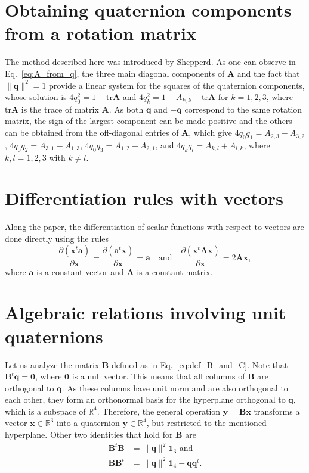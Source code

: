 \documentclass[aip,jcp,reprint,amsmath,amssymb,raggedbottom]{revtex4-1}
\newcommand{\mt}[1]{\boldsymbol{\mathbf{#1}}}           %
\newcommand{\vt}[1]{\boldsymbol{\mathbf{#1}}}           %
\newcommand{\tr}[1]{#1^t}                               %
\newcommand{\diff}[2]{\dfrac{\partial #1}{\partial #2}} %
\begin{document}
\section{Obtaining quaternion components from a rotation matrix}
\label{sec:quat_from_A}

The method described here was introduced by Shepperd.\cite{Shepperd1978} As one can observe in Eq.~\ref{eq:A_from_q}, the three main diagonal components of $\mt A$ and the fact that $\lVert \vt q \lVert^2 = 1$ provide a linear system for the squares of the quaternion components, whose solution is $4 q_0^2 = 1 + \text{tr}\mt A$ and $4 q_k^2 = 1 + A_{k,k} - \text{tr}\mt A$ for $k = 1, 2, 3$, where $\text{tr}\mt A$ is the trace of matrix $\mt A$. As both $\vt q$ and $- \vt q$ correspond to the same rotation matrix, the sign of the largest component\cite{Shepperd1978} can be made positive and the others can be obtained from the off-diagonal entries of $\mt A$, which give $4 q_0 q_1 = A_{2,3} - A_{3,2}$, $4 q_0 q_2 = A_{3,1} - A_{1,3}$, $4 q_0 q_3 = A_{1,2} - A_{2,1}$, and $4 q_k q_l = A_{k,l} + A_{l,k}$, where $k,l = 1,2,3$ with $k \neq l$.

\section{Differentiation rules with vectors}
\label{sec:Diff_Rules}

Along the paper, the differentiation of scalar functions with respect to vectors are done directly using the rules
\[
\diff{(\tr{\vt x}\vt a)}{\vt x} = \diff{(\tr{\vt a}\vt x)}{\vt x} = \vt a \quad \text{and} \quad \diff{(\tr{\vt x}\mt A \vt x)}{\vt x} = 2 \mt A \vt x,
\]
where $\vt a$ is a constant vector and $\mt A$ is a constant matrix.

\section{Algebraic relations involving unit quaternions}
\label{sec:auxiliary_math}

Let us analyze the matrix $\mt B$ defined as in Eq.~\ref{eq:def_B_and_C}. Note that $\tr{\mt B}\vt q = \vt 0$, where $\vt 0$ is a null vector.\cite{Haug1989, Shuster1993, Dichmann1999} This means that all columns of $\mt B$ are orthogonal to $\vt q$. As these columns have unit norm and are also orthogonal to each other, they form an orthonormal basis for the hyperplane orthogonal to $\mt q$, which is a subspace of $\mathbb{R}^4$. Therefore, the general operation $\vt y = \mt B \vt x$ transforms a vector $\vt x \in \mathbb{R}^3$ into a quaternion $\vt y \in \mathbb{R}^4$, but restricted to the mentioned hyperplane. Other two identities that hold for $\mt B$ are\citep{Haug1989}
\begin{align*}
\tr{\mt B}\mt B &= \lVert \vt q \lVert ^2{\mt 1}_3 \text{ and} \\
\mt B\tr{\mt B} &= \lVert \vt q \lVert ^2{\mt 1}_4 - {\vt q}\tr{\vt q}.
\end{align*}
\end{document}
